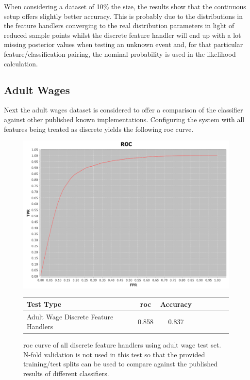 \documentclass[a4paper,11pt]{scrreprt}
\begin{document}
When considering a dataset of 10\% the size, the results show that the continuous setup offers slightly better accuracy. This is probably due to the distributions in the feature handlers converging to the real distribution parameters in light of reduced sample points whilst the discrete feature handler will end up with a lot missing posterior values when testing an unknown event and, for that particular feature/classification pairing, the nominal probability is used in the likelihood calculation. 

\subsection{Adult Wages}
Next the adult wages dataset is considered to offer a comparison of the classifier against other published known implementations. Configuring the system with all features being treated as discrete yields the following \acrshort{roc} curve.
\begin{figure}[h!]
\centering
\caption{\acrshort{roc} curve of all discrete feature handlers using adult wage test set. N-fold validation is not used in this test so that the provided training/test splits can be used to compare against the published results of different classifiers.}
\includegraphics[scale=0.45, trim=0 -20 0 0, clip=true] {all_discrete_features_adult_earnings.png}
\label{fig:adultwagesresults1}
\begin{tabular}{l*{6}{c}r}
Test Type & \acrshort{roc} & Accuracy \\
\hline
Adult Wage Discrete Feature Handlers & 0.858 & 0.837 \\
\end{tabular}
\end{figure}
\end{document}

